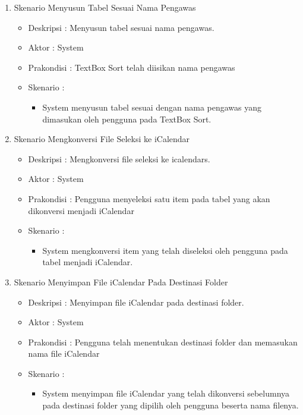 \begin{enumerate}
		\item Skenario Menyusun Tabel Sesuai Nama Pengawas
		{\renewcommand\labelitemi{}
		\begin{itemize}
			\item Deskripsi		: Menyusun tabel sesuai nama pengawas.
			\item Aktor				: System 
			\item Prakondisi	: TextBox Sort telah diisikan nama pengawas
			\item Skenario		:
				\begin{itemize}
					\item System menyusun tabel sesuai dengan nama pengawas yang dimasukan oleh pengguna pada TextBox Sort.
				\end{itemize}
		\end{itemize}
		}
		
		\item Skenario Mengkonversi File Seleksi ke iCalendar
		{\renewcommand\labelitemi{}
		\begin{itemize}
			\item Deskripsi		: Mengkonversi file seleksi ke icalendars.
			\item Aktor				: System 
			\item Prakondisi	: Pengguna menyeleksi satu item pada tabel yang akan dikonversi menjadi iCalendar
			\item Skenario		:
				\begin{itemize}
					\item System mengkonversi item yang telah diseleksi oleh pengguna pada tabel menjadi iCalendar.
				\end{itemize}
		\end{itemize}
		}
		
		\item Skenario Menyimpan File iCalendar Pada Destinasi Folder
		{\renewcommand\labelitemi{}
		\begin{itemize}
			\item Deskripsi		: Menyimpan file iCalendar pada destinasi folder.
			\item Aktor				: System 
			\item Prakondisi	: Pengguna telah menentukan destinasi folder dan memasukan nama file iCalendar
			\item Skenario		:
				\begin{itemize}
					\item System menyimpan file iCalendar yang telah dikonversi sebelumnya pada destinasi folder yang dipilih oleh pengguna beserta nama filenya.
				\end{itemize}
		\end{itemize}
		}
\end{enumerate}

